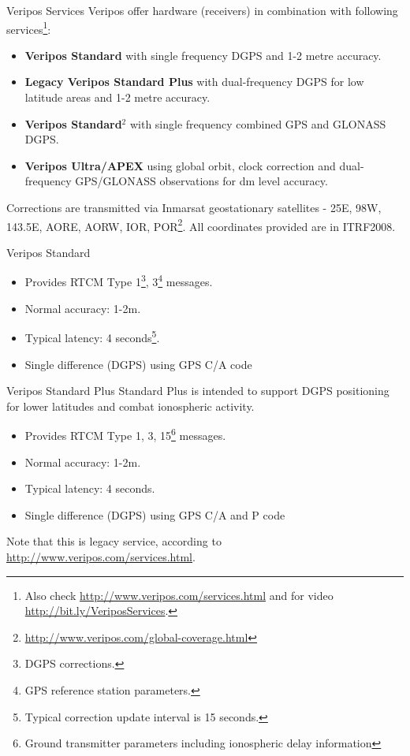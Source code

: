 \documentclass[11pt]{beamer}
\begin{document}
\begin{frame}[allowframebreaks]{Veripos Services}
	Veripos offer hardware (receivers) in combination with following services\footnote[frame]{Also check \url{http://www.veripos.com/services.html} and for video \url{http://bit.ly/VeriposServices}.}:
	
	\begin{itemize}
		\item \textbf{Veripos Standard} with single frequency DGPS and 1-2 metre accuracy.
		\item {\color{gray}\textbf{Legacy Veripos Standard Plus} with dual-frequency DGPS for low latitude areas and 1-2 metre accuracy.} 
		\item \textbf{Veripos Standard$^2$ } with single frequency combined GPS and GLONASS DGPS. 
		\item \textbf{Veripos Ultra/APEX} using global orbit, clock correction and dual-frequency GPS/GLONASS observations for dm level accuracy.
	\end{itemize}
	Corrections are transmitted via Inmarsat geostationary satellites - 25E, 98W, 143.5E, AORE, AORW, IOR, POR\footnote[frame]{\url{http://www.veripos.com/global-coverage.html}}. All coordinates provided are in ITRF2008.
\end{frame}

\begin{frame}{Veripos Standard}
	
	\begin{itemize}	
		\item Provides RTCM Type 1\footnote{DGPS corrections.}, 3\footnote{GPS reference station parameters.} messages.
		\item Normal accuracy: 1-2m. 
		\item Typical latency: 4 seconds\footnote{Typical correction update interval is 15 seconds.}.
		\item Single difference (DGPS) using GPS C/A code
	\end{itemize}	
	
\end{frame}

\begin{frame}{Veripos Standard Plus}
	Standard Plus is intended to support DGPS positioning for lower latitudes and combat ionospheric activity. 
	\begin{itemize}	
		\item Provides RTCM Type 1, 3, 15\footnote[frame]{Ground transmitter parameters including ionospheric delay information} messages.
		\item Normal accuracy: 1-2m. 
		\item Typical latency: 4 seconds.
		\item Single difference (DGPS) using GPS C/A and P code
	\end{itemize}	
	Note that this is legacy service, according to \url{http://www.veripos.com/services.html}.
\end{frame}
\end{document}
